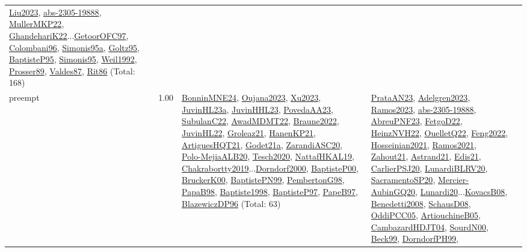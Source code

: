 {\begin{longtable}{p{3cm}r>{\raggedright\arraybackslash}p{6cm}>{\raggedright\arraybackslash}p{6cm}>{\raggedright\arraybackslash}p{8cm}}
\hyperref[detail:Liu2023]{Liu2023}, \hyperref[detail:abs-2305-19888]{abs-2305-19888}, \hyperref[detail:MullerMKP22]{MullerMKP22}, \hyperref[detail:GhandehariK22]{GhandehariK22}...\hyperref[detail:GetoorOFC97]{GetoorOFC97}, \hyperref[detail:Colombani96]{Colombani96}, \hyperref[detail:Simonis95a]{Simonis95a}, \hyperref[detail:Goltz95]{Goltz95}, \hyperref[detail:BaptisteP95]{BaptisteP95}, \hyperref[detail:Simonis95]{Simonis95}, \hyperref[detail:Weil1992]{Weil1992}, \hyperref[detail:Prosser89]{Prosser89}, \hyperref[detail:Valdes87]{Valdes87}, \hyperref[detail:Rit86]{Rit86} (Total: 168)\\
\index{preempt}\index{Concepts!preempt}preempt &  1.00 & \hyperref[detail:BonninMNE24]{BonninMNE24}, \hyperref[detail:Oujana2023]{Oujana2023}, \hyperref[detail:Xu2023]{Xu2023}, \hyperref[detail:JuvinHL23a]{JuvinHL23a}, \hyperref[detail:JuvinHHL23]{JuvinHHL23}, \hyperref[detail:PovedaAA23]{PovedaAA23}, \hyperref[detail:SubulanC22]{SubulanC22}, \hyperref[detail:AwadMDMT22]{AwadMDMT22}, \hyperref[detail:Braune2022]{Braune2022}, \hyperref[detail:JuvinHL22]{JuvinHL22}, \hyperref[detail:Groleaz21]{Groleaz21}, \hyperref[detail:HanenKP21]{HanenKP21}, \hyperref[detail:ArtiguesHQT21]{ArtiguesHQT21}, \hyperref[detail:Godet21a]{Godet21a}, \hyperref[detail:ZarandiASC20]{ZarandiASC20}, \hyperref[detail:Polo-MejiaALB20]{Polo-MejiaALB20}, \hyperref[detail:Tesch2020]{Tesch2020}, \hyperref[detail:NattafHKAL19]{NattafHKAL19}, \hyperref[detail:Chakrabortty2019]{Chakrabortty2019}...\hyperref[detail:Dorndorf2000]{Dorndorf2000}, \hyperref[detail:BaptisteP00]{BaptisteP00}, \hyperref[detail:BruckerK00]{BruckerK00}, \hyperref[detail:BaptistePN99]{BaptistePN99}, \hyperref[detail:PembertonG98]{PembertonG98}, \hyperref[detail:PapaB98]{PapaB98}, \hyperref[detail:Baptiste1998]{Baptiste1998}, \hyperref[detail:BaptisteP97]{BaptisteP97}, \hyperref[detail:PapeB97]{PapeB97}, \hyperref[detail:BlazewiczDP96]{BlazewiczDP96} (Total: 63) & \hyperref[detail:PrataAN23]{PrataAN23}, \hyperref[detail:Adelgren2023]{Adelgren2023}, \hyperref[detail:Ramos2023]{Ramos2023}, \hyperref[detail:abs-2305-19888]{abs-2305-19888}, \hyperref[detail:AbreuPNF23]{AbreuPNF23}, \hyperref[detail:FetgoD22]{FetgoD22}, \hyperref[detail:HeinzNVH22]{HeinzNVH22}, \hyperref[detail:OuelletQ22]{OuelletQ22}, \hyperref[detail:Feng2022]{Feng2022}, \hyperref[detail:Hosseinian2021]{Hosseinian2021}, \hyperref[detail:Ramos2021]{Ramos2021}, \hyperref[detail:Zahout21]{Zahout21}, \hyperref[detail:Astrand21]{Astrand21}, \hyperref[detail:Edis21]{Edis21}, \hyperref[detail:CarlierPSJ20]{CarlierPSJ20}, \hyperref[detail:LunardiBLRV20]{LunardiBLRV20}, \hyperref[detail:SacramentoSP20]{SacramentoSP20}, \hyperref[detail:Mercier-AubinGQ20]{Mercier-AubinGQ20}, \hyperref[detail:Lunardi20]{Lunardi20}...\hyperref[detail:KovacsB08]{KovacsB08}, \hyperref[detail:Benedetti2008]{Benedetti2008}, \hyperref[detail:SchausD08]{SchausD08}, \hyperref[detail:OddiPCC05]{OddiPCC05}, \hyperref[detail:ArtiouchineB05]{ArtiouchineB05}, \hyperref[detail:CambazardHDJT04]{CambazardHDJT04}, \hyperref[detail:SourdN00]{SourdN00}, \hyperref[detail:Beck99]{Beck99}, \hyperref[detail:DorndorfPH99]{DorndorfPH99}, 
\end{longtable}}
